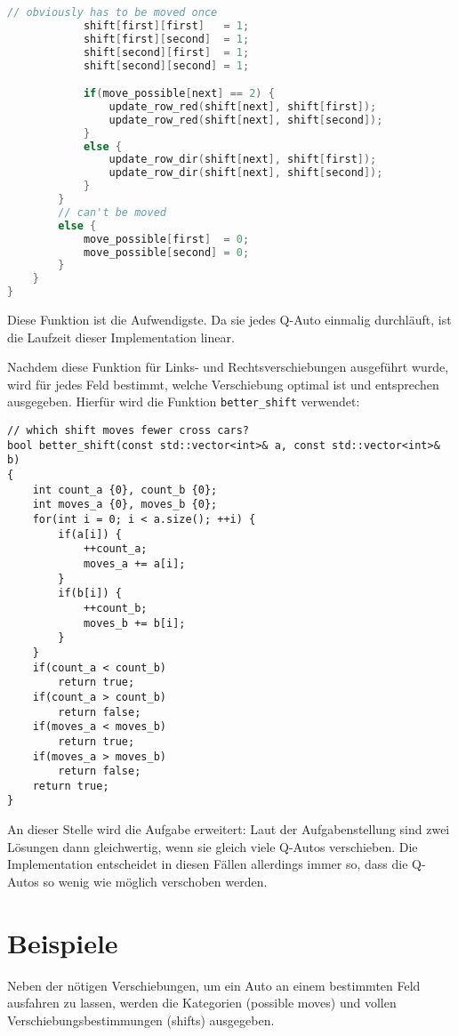 \documentclass[a4paper,10pt,ngerman]{scrartcl}
\begin{document}
\begin{lstlisting}[language=C++]
            // obviously has to be moved once
            shift[first][first]   = 1;
            shift[first][second]  = 1;
            shift[second][first]  = 1;
            shift[second][second] = 1;

            if(move_possible[next] == 2) {
                update_row_red(shift[next], shift[first]);
                update_row_red(shift[next], shift[second]);
            }
            else {
                update_row_dir(shift[next], shift[first]);
                update_row_dir(shift[next], shift[second]);
            }
        }
        // can't be moved
        else {
            move_possible[first]  = 0;
            move_possible[second] = 0;
        }
    }
}
\end{lstlisting}
Diese Funktion ist die Aufwendigste.
Da sie jedes Q-Auto einmalig durchläuft, ist die Laufzeit dieser Implementation linear.

Nachdem diese Funktion für Links- und Rechtsverschiebungen ausgeführt wurde, wird für jedes Feld bestimmt, welche Verschiebung optimal ist und entsprechen ausgegeben.
Hierfür wird die Funktion \lstinline{better_shift} verwendet:
\begin{lstlisting}
// which shift moves fewer cross cars?
bool better_shift(const std::vector<int>& a, const std::vector<int>& b)
{
    int count_a {0}, count_b {0};
    int moves_a {0}, moves_b {0};
    for(int i = 0; i < a.size(); ++i) {
        if(a[i]) {
            ++count_a;
            moves_a += a[i];
        }
        if(b[i]) {
            ++count_b;
            moves_b += b[i];
        }
    }
    if(count_a < count_b)
        return true;
    if(count_a > count_b)
        return false;
    if(moves_a < moves_b)
        return true;
    if(moves_a > moves_b)
        return false;
    return true;
}
\end{lstlisting}
An dieser Stelle wird die Aufgabe erweitert:
Laut der Aufgabenstellung sind zwei Lösungen dann gleichwertig, wenn sie gleich viele Q-Autos verschieben.
Die Implementation entscheidet in diesen Fällen allerdings immer so, dass die Q-Autos so wenig wie möglich verschoben werden.

\section{Beispiele}
Neben der nötigen Verschiebungen, um ein Auto an einem bestimmten Feld ausfahren zu lassen, werden die Kategorien (possible moves) und vollen Verschiebungsbestimmungen (shifts) ausgegeben.
\end{document}
